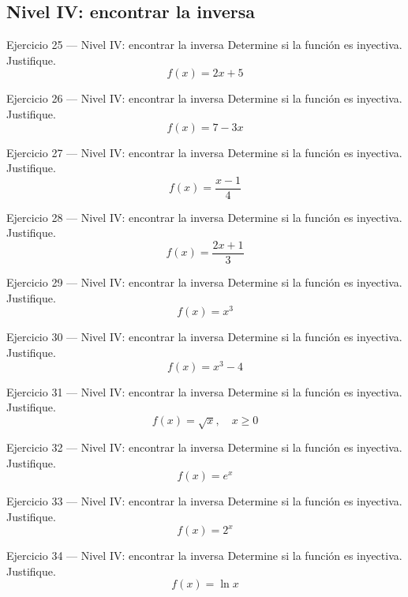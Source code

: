 \documentclass[aspectratio=169,10pt]{beamer}
\begin{document}
\subsection{Nivel IV: encontrar la inversa}
\begin{frame}{Ejercicio 25 — Nivel IV: encontrar la inversa}
Determine si la función es inyectiva. Justifique.
\[
f(x)=2x+5
\]
\end{frame}

\begin{frame}{Ejercicio 26 — Nivel IV: encontrar la inversa}
Determine si la función es inyectiva. Justifique.
\[
f(x)=7-3x
\]
\end{frame}

\begin{frame}{Ejercicio 27 — Nivel IV: encontrar la inversa}
Determine si la función es inyectiva. Justifique.
\[
f(x)=\frac{x-1}{4}
\]
\end{frame}

\begin{frame}{Ejercicio 28 — Nivel IV: encontrar la inversa}
Determine si la función es inyectiva. Justifique.
\[
f(x)=\frac{2x+1}{3}
\]
\end{frame}

\begin{frame}{Ejercicio 29 — Nivel IV: encontrar la inversa}
Determine si la función es inyectiva. Justifique.
\[
f(x)=x^3
\]
\end{frame}

\begin{frame}{Ejercicio 30 — Nivel IV: encontrar la inversa}
Determine si la función es inyectiva. Justifique.
\[
f(x)=x^3-4
\]
\end{frame}

\begin{frame}{Ejercicio 31 — Nivel IV: encontrar la inversa}
Determine si la función es inyectiva. Justifique.
\[
f(x)=\sqrt{x},\quad x\ge0
\]
\end{frame}

\begin{frame}{Ejercicio 32 — Nivel IV: encontrar la inversa}
Determine si la función es inyectiva. Justifique.
\[
f(x)=e^x
\]
\end{frame}

\begin{frame}{Ejercicio 33 — Nivel IV: encontrar la inversa}
Determine si la función es inyectiva. Justifique.
\[
f(x)=2^x
\]
\end{frame}

\begin{frame}{Ejercicio 34 — Nivel IV: encontrar la inversa}
Determine si la función es inyectiva. Justifique.
\[
f(x)=\ln x
\]
\end{frame}
\end{document}
